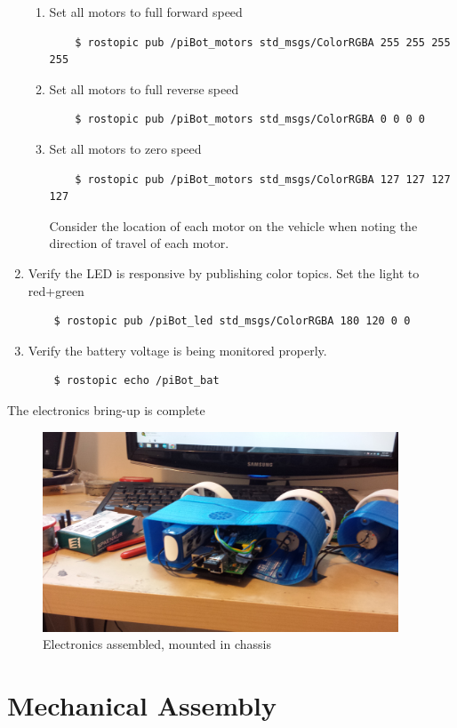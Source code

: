 \documentclass[12pt,titlepage,oneside]{memoir}
\begin{document}
\begin{enumerate}
\begin{enumerate}
	\item Set all motors to full forward speed
	\begin{verbatim}
	$ rostopic pub /piBot_motors std_msgs/ColorRGBA 255 255 255 255
	\end{verbatim}
	\item Set all motors to full reverse speed
	\begin{verbatim}
	$ rostopic pub /piBot_motors std_msgs/ColorRGBA 0 0 0 0
	\end{verbatim}
	\item Set all motors to zero speed
	\begin{verbatim}
	$ rostopic pub /piBot_motors std_msgs/ColorRGBA 127 127 127 127
	\end{verbatim}
	Consider the location of each motor on the vehicle when noting the direction of travel of each
 motor.
 	\end{enumerate}
 	\item Verify the LED is responsive by publishing color topics. Set the light to red+green
 	\begin{verbatim}
 	$ rostopic pub /piBot_led std_msgs/ColorRGBA 180 120 0 0
 	\end{verbatim}
 	\item Verify the battery voltage is being monitored properly.
 	\begin{verbatim}
 	$ rostopic echo /piBot_bat
 	\end{verbatim}
\end{enumerate}
The electronics bring-up is complete

\begin{figure}
\includegraphics[width=400px]{picture/side.jpg}
\caption{Electronics assembled, mounted in chassis}
\end{figure}

\section{Mechanical Assembly}
\end{document}
